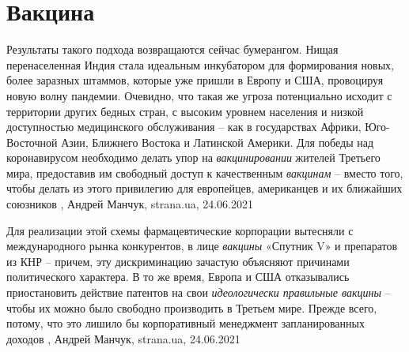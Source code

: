  
 
 
 
 
\chapter{Вакцина}

Результаты такого подхода возвращаются сейчас бумерангом. Нищая перенаселенная
Индия стала идеальным инкубатором для формирования новых, более заразных
штаммов, которые уже пришли в Европу и США, провоцируя новую волну пандемии.
Очевидно, что такая же угроза потенциально исходит с территории других бедных
стран, с высоким уровнем населения и низкой доступностью медицинского
обслуживания – как в государствах Африки, Юго-Восточной Азии, Ближнего Востока
и Латинской Америки. Для победы над коронавирусом необходимо делать упор на
\emph{вакцинировании} жителей Третьего мира, предоставив им свободный доступ к
качественным \emph{вакцинам} – вместо того, чтобы делать из этого привилегию для
европейцев, американцев и их ближайших союзников
, 
Андрей Манчук, strana.ua, 24.06.2021

Для реализации этой схемы фармацевтические корпорации вытесняли с
международного рынка конкурентов, в лице \emph{вакцины} «Спутник V» и препаратов из
КНР – причем, эту дискриминацию зачастую объясняют причинами политического
характера. В то же время, Европа и США отказывались приостановить действие
патентов на свои \emph{идеологически правильные вакцины} – чтобы их можно было
свободно производить в Третьем мире. Прежде всего, потому, что это лишило бы
корпоративный менеджмент запланированных доходов
, 
Андрей Манчук, strana.ua, 24.06.2021

